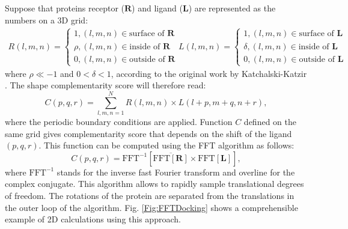 Suppose that proteins receptor ($\mathbf{R}$) and ligand ($\mathbf{L}$) are represented as the numbers on a 3D grid:
\begin{eqnarray}
 R(l,m,n)= \begin{cases}
            1, (l,m,n)\in \mbox{surface of }\mathbf{R}\\
            \rho, (l,m,n)\in \mbox{inside of }\mathbf{R}\\
            0, (l,m,n)\in \mbox{outside of }\mathbf{R}
           \end{cases}
L(l,m,n)= \begin{cases}
            1, (l,m,n)\in \mbox{surface of }\mathbf{L}\\
            \delta, (l,m,n)\in \mbox{inside of }\mathbf{L}\\
            0, (l,m,n)\in \mbox{outside of }\mathbf{L}
           \end{cases}
           \label{Eq:LigRecGrid}
\end{eqnarray}
where $\rho\ll-1$ and $0<\delta<1$, according to the original work by Katchalski-Katzir \cite{katchalski1992molecular}. The shape complementarity score will therefore read:
\begin{equation}
 C(p,q,r)=\sum_{l,m,n=1}^{N} R(l,m,n)\times L(l+p,m+q,n+r),
\end{equation}
where the periodic boundary conditions are applied. Function $C$ defined on the same grid gives complementarity score that depends on the shift of the ligand $(p,q,r)$.
This function can be computed using the FFT algorithm as follows:
\begin{equation*}
 C(p,q,r)=\mbox{FFT}^{-1}\left[ \overline{\mbox{FFT}[\mathbf{R}]}\times \mbox{FFT}[\mathbf{L}]\right], \label{Eq:FFTDockingConvolution}
\end{equation*}
where $\mbox{FFT}^{-1}$ stands for the inverse fast Fourier transform and overline for the complex conjugate. This algorithm allows to rapidly sample translational degrees of freedom.
The rotations of the protein are separated from the translations in the outer loop of the algorithm. Fig. \ref{Fig:FFTDocking} shows a comprehensible example of 2D calculations
using this approach.

